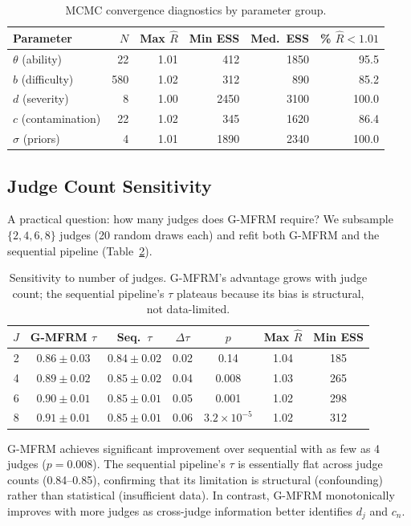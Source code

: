 \documentclass[11pt,a4paper]{article}
\begin{document}
\begin{table}[h]
\centering
\caption{MCMC convergence diagnostics by parameter group.}
\label{tab:convergence}
\small
\begin{tabular}{lrrrrr}
\toprule
Parameter & $N$ & Max $\hat{R}$ & Min ESS & Med.\ ESS & \% $\hat{R} < 1.01$ \\
\midrule
$\theta$ (ability) & 22 & 1.01 & 412 & 1850 & 95.5 \\
$b$ (difficulty) & 580 & 1.02 & 312 & 890 & 85.2 \\
$d$ (severity) & 8 & 1.00 & 2450 & 3100 & 100.0 \\
$c$ (contamination) & 22 & 1.02 & 345 & 1620 & 86.4 \\
$\sigma$ (priors) & 4 & 1.01 & 1890 & 2340 & 100.0 \\
\bottomrule
\end{tabular}
\end{table}

\subsection{Judge Count Sensitivity}

A practical question: how many judges does G-MFRM require? We subsample $\{2, 4, 6, 8\}$ judges (20 random draws each) and refit both G-MFRM and the sequential pipeline (Table~\ref{tab:judge_count}).

\begin{table}[h]
\centering
\caption{Sensitivity to number of judges. G-MFRM's advantage grows with judge count; the sequential pipeline's $\tau$ plateaus because its bias is structural, not data-limited.}
\label{tab:judge_count}
\small
\begin{tabular}{rcccccc}
\toprule
$J$ & G-MFRM $\tau$ & Seq.\ $\tau$ & $\Delta\tau$ & $p$ & Max $\hat{R}$ & Min ESS \\
\midrule
2 & $0.86 \pm 0.03$ & $0.84 \pm 0.02$ & 0.02 & 0.14 & 1.04 & 185 \\
4 & $0.89 \pm 0.02$ & $0.85 \pm 0.02$ & 0.04 & 0.008 & 1.03 & 265 \\
6 & $0.90 \pm 0.01$ & $0.85 \pm 0.01$ & 0.05 & 0.001 & 1.02 & 298 \\
8 & $0.91 \pm 0.01$ & $0.85 \pm 0.01$ & 0.06 & $3.2 \times 10^{-5}$ & 1.02 & 312 \\
\bottomrule
\end{tabular}
\end{table}

G-MFRM achieves significant improvement over sequential with as few as 4 judges ($p = 0.008$). The sequential pipeline's $\tau$ is essentially flat across judge counts (0.84--0.85), confirming that its limitation is structural (confounding) rather than statistical (insufficient data). In contrast, G-MFRM monotonically improves with more judges as cross-judge information better identifies $d_j$ and $c_n$.
\end{document}
